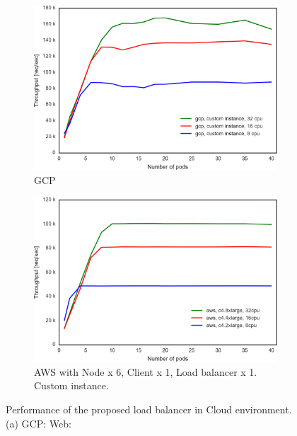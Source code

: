 \begin{figure}[tb]

  \begin{subfigure}[t]{\columnwidth}
    \includegraphics[width=0.9\columnwidth]{Figs/gcp_all_ieice}
    \caption{GCP}
    \label{fig:gcp_all_ieice}
  \end{subfigure}

  \par\bigskip

  \begin{subfigure}[t]{\columnwidth}
    \includegraphics[width=0.9\columnwidth]{Figs/aws_c4_ieice}
    \caption{AWS with Node x 6, Client x 1, Load balancer x 1. Custom instance. }
    \label{fig:aws_c4_ieice}
  \end{subfigure}

  \caption{Performance of the proposed load balancer in Cloud environment.
(a) GCP: Web: 
}
  \label{fig:ipvs_performance_in_aws_gcp}

\end{figure}

